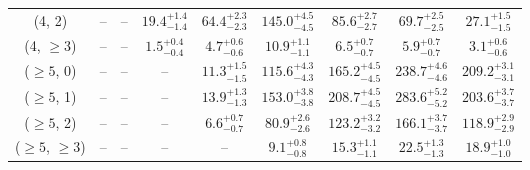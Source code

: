 \begin{table}[h!]
{\begin{tabular}{ccccccccc}
	(4, 2) & -- & -- & $19.4^{+ 1.4 }_{- 1.4 }$ & $64.4^{+ 2.3 }_{- 2.3 }$ & $145.0^{+ 4.5 }_{- 4.5 }$ & $85.6^{+ 2.7 }_{- 2.7 }$ & $69.7^{+ 2.5 }_{- 2.5 }$ & $27.1^{+ 1.5 }_{- 1.5 }$ \\[0.5ex] 
	(4, $\ge3$) & -- & -- & $1.5^{+ 0.4 }_{- 0.4 }$ & $4.7^{+ 0.6 }_{- 0.6 }$ & $10.9^{+ 1.1 }_{- 1.1 }$ & $6.5^{+ 0.7 }_{- 0.7 }$ & $5.9^{+ 0.7 }_{- 0.7 }$ & $3.1^{+ 0.6 }_{- 0.6 }$ \\[0.5ex] 
	($\ge5$, 0) & -- & -- & -- & $11.3^{+ 1.5 }_{- 1.5 }$ & $115.6^{+ 4.3 }_{- 4.3 }$ & $165.2^{+ 4.5 }_{- 4.5 }$ & $238.7^{+ 4.6 }_{- 4.6 }$ & $209.2^{+ 3.1 }_{- 3.1 }$ \\[0.5ex] 
	($\ge5$, 1) & -- & -- & -- & $13.9^{+ 1.3 }_{- 1.3 }$ & $153.0^{+ 3.8 }_{- 3.8 }$ & $208.7^{+ 4.5 }_{- 4.5 }$ & $283.6^{+ 5.2 }_{- 5.2 }$ & $203.6^{+ 3.7 }_{- 3.7 }$ \\[0.5ex] 
	($\ge5$, 2) & -- & -- & -- & $6.6^{+ 0.7 }_{- 0.7 }$ & $80.9^{+ 2.6 }_{- 2.6 }$ & $123.2^{+ 3.2 }_{- 3.2 }$ & $166.1^{+ 3.7 }_{- 3.7 }$ & $118.9^{+ 2.9 }_{- 2.9 }$ \\[0.5ex] 
	($\ge5$, $\ge3$) & -- & -- & -- & -- & $9.1^{+ 0.8 }_{- 0.8 }$ & $15.3^{+ 1.1 }_{- 1.1 }$ & $22.5^{+ 1.3 }_{- 1.3 }$ & $18.9^{+ 1.0 }_{- 1.0 }$ \\[0.5ex] 
	\hline
	\hline
\end{tabular}}
\end{table}
